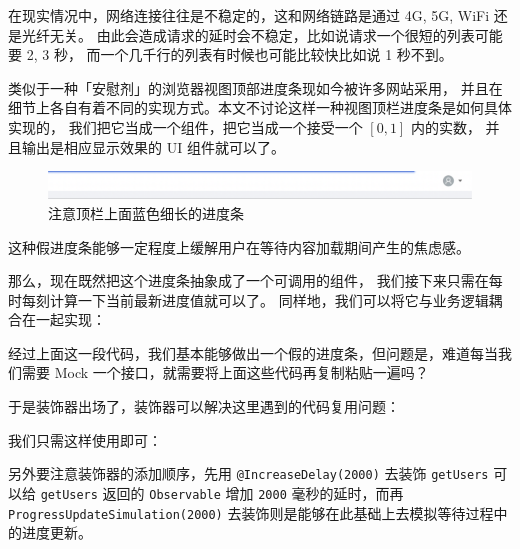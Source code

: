 \documentclass{ctexart}
\begin{document}
    在现实情况中，网络连接往往是不稳定的，这和网络链路是通过 4G, 5G, WiFi 还是光纤无关。
    由此会造成请求的延时会不稳定，比如说请求一个很短的列表可能要 2, 3 秒，
    而一个几千行的列表有时候也可能比较快比如说 1 秒不到。

    类似于一种「安慰剂」的浏览器视图顶部进度条现如今被许多网站采用，
    并且在细节上各自有着不同的实现方式。本文不讨论这样一种视图顶栏进度条是如何具体实现的，
    我们把它当成一个组件，把它当成一个接受一个 $[0,1]$ 内的实数，
    并且输出是相应显示效果的 UI 组件就可以了。

    \begin{figure}[H]
        \begin{center}
            \includegraphics[width=\textwidth]{figures/1.png}
            \caption{注意顶栏上面蓝色细长的进度条}
        \end{center}
    \end{figure}
    这种假进度条能够一定程度上缓解用户在等待内容加载期间产生的焦虑感。

    那么，现在既然把这个进度条抽象成了一个可调用的组件，
    我们接下来只需在每时每刻计算一下当前最新进度值就可以了。
    同样地，我们可以将它与业务逻辑耦合在一起实现：

    \pagebreak
    

    经过上面这一段代码，我们基本能够做出一个假的进度条，但问题是，难道每当我们需要 Mock 一个接口，就需要将上面这些代码再复制粘贴一遍吗？

    于是装饰器出场了，装饰器可以解决这里遇到的代码复用问题：

    

    \pagebreak
    我们只需这样使用即可：

    

    另外要注意装饰器的添加顺序，先用 \verb`@IncreaseDelay(2000)` 去装饰 \verb`getUsers` 可以给 \verb`getUsers` 返回的 \verb`Observable` 增加 \verb`2000` 毫秒的延时，而再 \verb`ProgressUpdateSimulation(2000)` 去装饰则是能够在此基础上去模拟等待过程中的进度更新。
\end{document}
